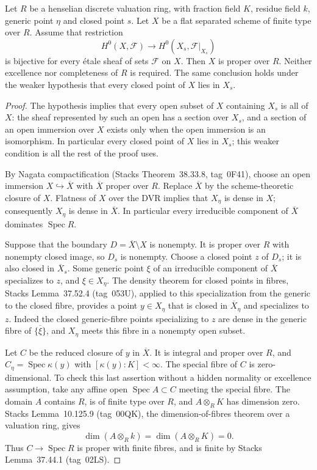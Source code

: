 \begin{lemma}\label{C:henselian-flat-trait-proper}
Let $R$ be a henselian discrete valuation ring, with fraction field
$K$, residue field $k$, generic point $\eta$ and closed point $s$.
Let $X$ be a flat separated scheme of finite type over $R$.
Assume that restriction
\[
 H^0(X,\mathcal F)\longrightarrow H^0(X_s,\mathcal F|_{X_s})
\]
is bijective for every \'etale sheaf of sets $\mathcal F$ on $X$.
Then $X$ is proper over $R$. Neither excellence nor completeness of
$R$ is required. The same conclusion holds under the weaker hypothesis
that every closed point of $X$ lies in $X_s$.
\end{lemma}
\begin{proof}
The hypothesis implies that every open subset of $X$ containing
$X_s$ is all of $X$: the sheaf represented by such an open has a
section over $X_s$, and a section of an open immersion over $X$
exists only when the open immersion is an isomorphism.
In particular every closed point of $X$ lies in $X_s$; this weaker
condition is all the rest of the proof uses.

By Nagata compactification (Stacks Theorem~38.33.8, tag~0F41),
choose an open immersion $X\hookrightarrow\overline X$ with
$\overline X$ proper over $R$. Replace $\overline X$ by the
scheme-theoretic closure of $X$. Flatness of $X$ over the DVR implies
that $X_\eta$ is dense in $X$; consequently $X_\eta$ is dense in
$\overline X$. In particular every irreducible component of
$\overline X$ dominates $\operatorname{Spec}R$.

Suppose that the boundary $D=\overline X\setminus X$ is nonempty.
It is proper over $R$ with nonempty closed image, so $D_s$ is nonempty.
Choose a closed point $z$ of $D_s$; it is also closed in
$\overline X_s$. Some generic point $\xi$ of an irreducible component
of $\overline X$ specializes to $z$, and $\xi\in X_\eta$.
The density theorem for closed points in fibres, Stacks
Lemma~37.52.4 (tag~053U), applied to this specialization from the
generic to the closed fibre, provides a point $y\in X_\eta$ that is
closed in $\overline X_\eta$ and specializes to $z$. Indeed the closed
generic-fibre points specializing to $z$ are dense in the generic
fibre of $\overline{\{\xi\}}$, and $X_\eta$ meets this fibre in a
nonempty open subset.

Let $C$ be the reduced closure of $y$ in $\overline X$. It is integral
and proper over $R$, and $C_\eta=\operatorname{Spec}\kappa(y)$ with
$[\kappa(y):K]<\infty$. The special fibre of $C$ is zero-dimensional.
To check this last assertion without a hidden normality or excellence
assumption, take any affine open $\operatorname{Spec}A\subset C$
meeting the special fibre. The domain $A$ contains $R$, is of finite
type over $R$, and $A\otimes_RK$ has dimension zero. Stacks
Lemma~10.125.9 (tag~00QK), the dimension-of-fibres theorem over a
valuation ring, gives
\[
 \dim(A\otimes_R k)=\dim(A\otimes_RK)=0.
\]
Thus $C\to\operatorname{Spec}R$ is proper with finite fibres, and is
finite by Stacks Lemma~37.44.1 (tag~02LS).


\end{proof}
